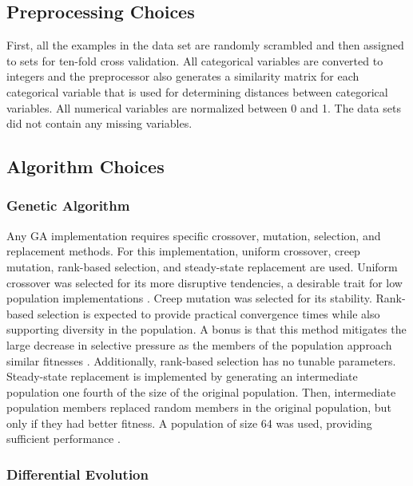 \documentclass[twoside,11pt]{article}
\begin{document}
\subsection{Preprocessing Choices}

	First, all the examples in the data set are randomly scrambled and then assigned to sets for ten-fold cross validation.
	All categorical variables are converted to integers
	and the preprocessor also generates a similarity matrix for each categorical variable that is used for determining distances between categorical variables.
	All numerical variables are normalized between 0 and 1.
	The data sets did not contain any missing variables.

\subsection{Algorithm Choices}


\subsubsection{Genetic Algorithm}

	Any GA implementation requires specific crossover, mutation, selection, and replacement methods. 
	For this implementation, uniform crossover, creep mutation, rank-based selection, and steady-state replacement are used. 
	Uniform crossover was selected for its more disruptive tendencies, a desirable trait for low population implementations \citep{ga_tutorial}. 
	Creep mutation was selected for its stability. 
	Rank-based selection is expected to provide practical convergence times while also supporting diversity in the population. 
	A bonus is that this method mitigates the large decrease in selective pressure as the members of the population approach similar fitnesses \citep{ga_tutorial}. 
	Additionally, rank-based selection has no tunable parameters. 
	Steady-state replacement is implemented by generating an intermediate population one fourth of the size of the original population. 
	Then, intermediate population members replaced random members in the original population, but only if they had better fitness.
	A population of size 64 was used, providing sufficient performance \citep{ga_tutorial}.

\subsubsection{Differential Evolution}
	
\end{document}
